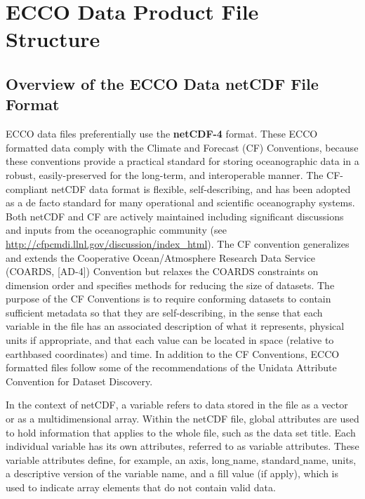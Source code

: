\pagebreak
\section{ECCO Data Product File Structure}
\subsection{Overview of the ECCO Data netCDF File Format}

ECCO data files preferentially use the \textbf{netCDF-4} format. These ECCO formatted data comply with the Climate and Forecast (CF) Conventions, because these conventions provide a practical standard for storing oceanographic data in a robust, easily-preserved for the long-term, and interoperable manner. The CF-compliant netCDF data format is flexible, self-describing, and has been adopted as a de facto standard for many operational and scientific oceanography systems. Both netCDF and CF are actively maintained
including significant discussions and inputs from the oceanographic community (see \url{http://cfpcmdi.llnl.gov/discussion/index_html}). 
The CF convention generalizes and extends the Cooperative Ocean/Atmosphere Research Data Service (COARDS, [AD-4]) Convention but relaxes the COARDS constraints on dimension order and specifies methods for reducing the size of datasets. The purpose
of the CF Conventions is to require conforming datasets to contain sufficient metadata so that they are
self-describing, in the sense that each variable in the file has an associated description of what it
represents, physical units if appropriate, and that each value can be located in space (relative to earthbased coordinates) and time. In addition to the CF Conventions, ECCO formatted files follow some of the recommendations of the Unidata Attribute Convention for Dataset Discovery. \par \vspace{0.1in}

In the context of netCDF, a variable refers to data stored in the file as a vector or as a
multidimensional array. Within the netCDF file, global attributes are used to hold information that applies to the whole file, such
as the data set title. Each individual variable has its own attributes, referred to as variable attributes. These variable attributes define, for example, an axis, long$\_$name, standard$\_$name, units, a descriptive version of the variable name, and a fill value (if apply), which is used to indicate array elements that do not
contain valid data.

